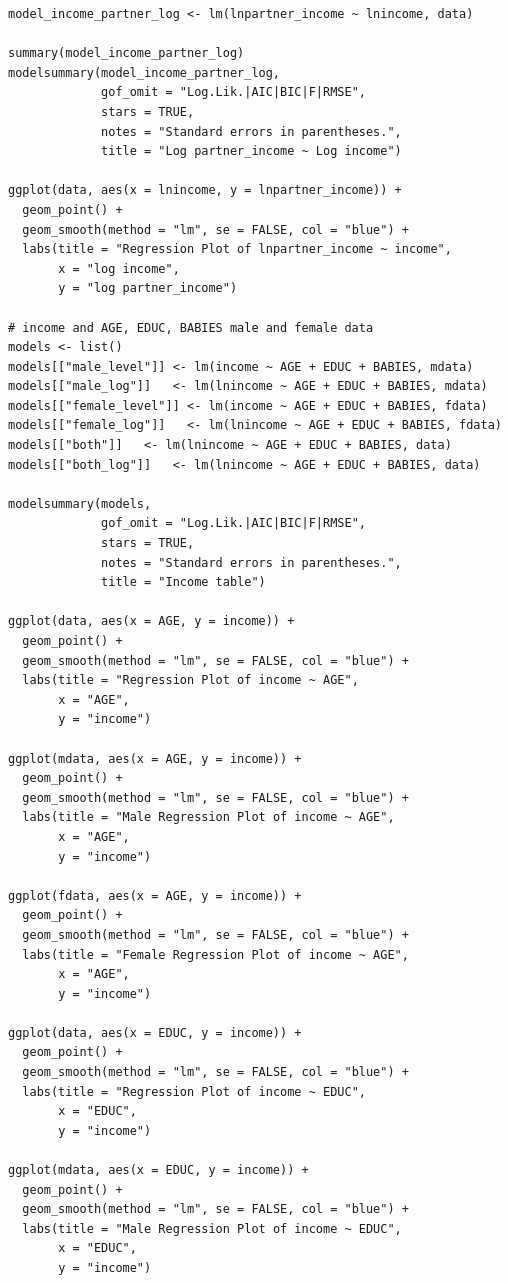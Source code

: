 \documentclass{article}[13pt]
\begin{document}
\begin{verbatim}
model_income_partner_log <- lm(lnpartner_income ~ lnincome, data)

summary(model_income_partner_log)
modelsummary(model_income_partner_log,
             gof_omit = "Log.Lik.|AIC|BIC|F|RMSE",
             stars = TRUE,
             notes = "Standard errors in parentheses.",
             title = "Log partner_income ~ Log income")

ggplot(data, aes(x = lnincome, y = lnpartner_income)) +
  geom_point() +
  geom_smooth(method = "lm", se = FALSE, col = "blue") +
  labs(title = "Regression Plot of lnpartner_income ~ income",
       x = "log income",
       y = "log partner_income")

# income and AGE, EDUC, BABIES male and female data
models <- list()
models[["male_level"]] <- lm(income ~ AGE + EDUC + BABIES, mdata)
models[["male_log"]]   <- lm(lnincome ~ AGE + EDUC + BABIES, mdata)
models[["female_level"]] <- lm(income ~ AGE + EDUC + BABIES, fdata)
models[["female_log"]]   <- lm(lnincome ~ AGE + EDUC + BABIES, fdata)
models[["both"]]   <- lm(lnincome ~ AGE + EDUC + BABIES, data)
models[["both_log"]]   <- lm(lnincome ~ AGE + EDUC + BABIES, data)

modelsummary(models,
             gof_omit = "Log.Lik.|AIC|BIC|F|RMSE",
             stars = TRUE,
             notes = "Standard errors in parentheses.",
             title = "Income table")

ggplot(data, aes(x = AGE, y = income)) +
  geom_point() +
  geom_smooth(method = "lm", se = FALSE, col = "blue") +
  labs(title = "Regression Plot of income ~ AGE",
       x = "AGE",
       y = "income")

ggplot(mdata, aes(x = AGE, y = income)) +
  geom_point() +
  geom_smooth(method = "lm", se = FALSE, col = "blue") +
  labs(title = "Male Regression Plot of income ~ AGE",
       x = "AGE",
       y = "income")

ggplot(fdata, aes(x = AGE, y = income)) +
  geom_point() +
  geom_smooth(method = "lm", se = FALSE, col = "blue") +
  labs(title = "Female Regression Plot of income ~ AGE",
       x = "AGE",
       y = "income")

ggplot(data, aes(x = EDUC, y = income)) +
  geom_point() +
  geom_smooth(method = "lm", se = FALSE, col = "blue") +
  labs(title = "Regression Plot of income ~ EDUC",
       x = "EDUC",
       y = "income")

ggplot(mdata, aes(x = EDUC, y = income)) +
  geom_point() +
  geom_smooth(method = "lm", se = FALSE, col = "blue") +
  labs(title = "Male Regression Plot of income ~ EDUC",
       x = "EDUC",
       y = "income")


\end{verbatim}
\end{document}
